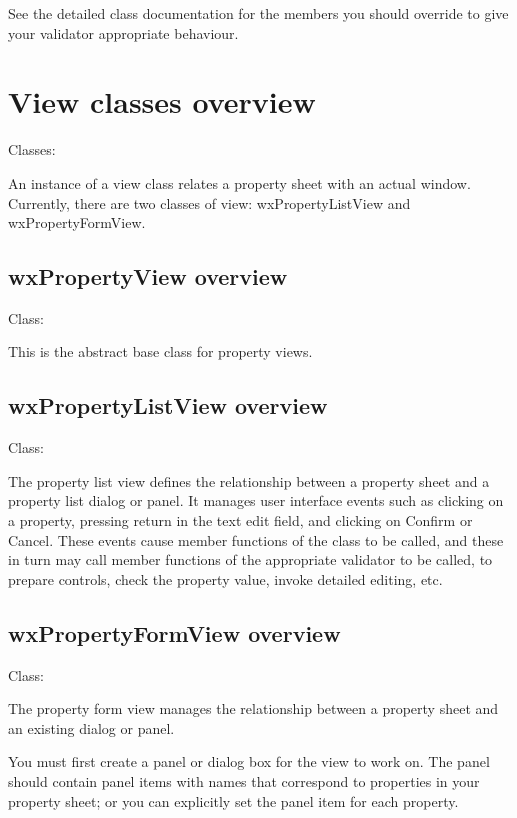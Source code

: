 See the detailed class documentation for the members you should override
to give your validator appropriate behaviour.

\section{View classes overview}\label{viewoverview}

Classes: 

An instance of a view class relates a property sheet with an actual window.
Currently, there are two classes of view: wxPropertyListView and wxPropertyFormView.

\subsection{wxPropertyView overview}\label{wxpropertyviewoverview}

Class: 

This is the abstract base class for property views.

\subsection{wxPropertyListView overview}\label{wxpropertylistviewoverview}

Class: 

The property list view defines the relationship between a property sheet and
a property list dialog or panel. It manages user interface events such as
clicking on a property, pressing return in the text edit field, and clicking
on Confirm or Cancel. These events cause member functions of the
class to be called, and these in turn may call member functions of
the appropriate validator to be called, to prepare controls, check the property value,
invoke detailed editing, etc.

\subsection{wxPropertyFormView overview}\label{wxpropertyformviewoverview}

Class: 

The property form view manages the relationship between a property sheet
and an existing dialog or panel.

You must first create a panel or dialog box for the view to work on.
The panel should contain panel items with names that correspond to
properties in your property sheet; or you can explicitly set the
panel item for each property.


